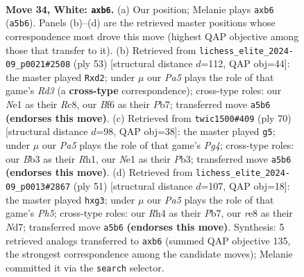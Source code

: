 \documentclass[11pt]{article}
\begin{document}
\clearpage

\begin{figure}[p]\centering
\begin{subfigure}{0.46\textwidth}\centering
\resizebox{\linewidth}{!}{%
\newchessgame
\chessboard[
  setfen={r3r3/1kpb4/pp1n1B2/P2N1p2/4p2R/1B6/1P2KPP1/R3N3 w - - 3 34},
  showmover=false,
  pgfstyle=straightmove, color=movearrow, markmove={a5-b6}
]}
\caption{}
\end{subfigure}\hfill
\begin{subfigure}{0.46\textwidth}\centering
\resizebox{\linewidth}{!}{%
\newchessgame
\chessboard[
  setfen={2r2k2/1p3pp1/2br4/p3n1p1/4P3/PB2NP1P/1P1R2P1/3R2K1 b - - 2 27},
  showmover=false,
  pgfstyle=straightmove, color=movearrow, markmove={d6-d2}
]}
\caption{}
\end{subfigure}
\\[4pt]
\begin{subfigure}{0.46\textwidth}\centering
\resizebox{\linewidth}{!}{%
\newchessgame
\chessboard[
  setfen={2r5/1pr1npk1/p3b1pp/3p4/5NPP/1P2PP2/P4K2/1B1R3R w - - 7 36},
  showmover=false,
  pgfstyle=straightmove, color=movearrow, markmove={g4-g5}
]}
\caption{}
\end{subfigure}\hfill
\begin{subfigure}{0.46\textwidth}\centering
\resizebox{\linewidth}{!}{%
\newchessgame
\chessboard[
  setfen={5rk1/1p1n2p1/4p3/p1p1P3/Pb1n1P1p/4N1B1/1P3PKP/R4R2 b - - 1 26},
  showmover=false,
  pgfstyle=straightmove, color=movearrow, markmove={h4-g3}
]}
\caption{}
\end{subfigure}
\caption{\textbf{Move 34, White: \texttt{axb6}.} (a) Our position; Melanie plays \texttt{axb6} (\texttt{a5b6}). Panels (b)--(d) are the retrieved master positions whose correspondence most drove this move (highest QAP objective among those that transfer to it). (b) Retrieved from \texttt{lichess\_elite\_2024-09\_p0021\#2508} (ply 53) [structural distance $d$=112, QAP obj=44]: the master played \texttt{Rxd2}; under $\mu$ our \emph{Pa5} plays the role of that game's \emph{Rd3} (a \textbf{cross-type} correspondence); cross-type roles: our \emph{N}e1 as their \emph{R}c8, our \emph{B}f6 as their \emph{P}b7; transferred move \texttt{a5b6} \textbf{(endorses this move)}. (c) Retrieved from \texttt{twic1500\#409} (ply 70) [structural distance $d$=98, QAP obj=38]: the master played \texttt{g5}; under $\mu$ our \emph{Pa5} plays the role of that game's \emph{Pg4}; cross-type roles: our \emph{B}b3 as their \emph{R}h1, our \emph{N}e1 as their \emph{P}b3; transferred move \texttt{a5b6} \textbf{(endorses this move)}. (d) Retrieved from \texttt{lichess\_elite\_2024-09\_p0013\#2867} (ply 51) [structural distance $d$=107, QAP obj=18]: the master played \texttt{hxg3}; under $\mu$ our \emph{Pa5} plays the role of that game's \emph{Ph5}; cross-type roles: our \emph{R}h4 as their \emph{P}b7, our \emph{r}e8 as their \emph{N}d7; transferred move \texttt{a5b6} \textbf{(endorses this move)}. Synthesis: 5 retrieved analogs transferred to \texttt{axb6} (summed QAP objective 135, the strongest correspondence among the candidate moves); Melanie committed it via the \texttt{search} selector.}
\label{fig:thought-m66}
\end{figure}
\end{document}
